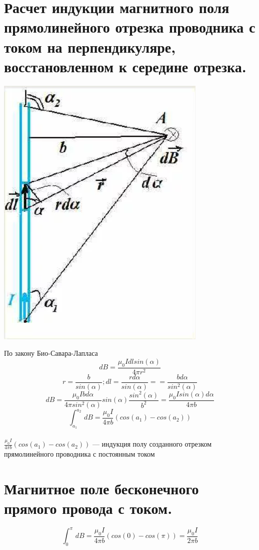 \documentclass[12pt]{report}
\begin{document}
\section{Расчет индукции магнитного поля прямолинейного отрезка проводника с током на перпендикуляре, восстановленном к середине отрезка.}
\begin{center}
    \includegraphics[scale=0.7]{graphics/t21.png}
\end{center}
По закону Био-Савара-Лапласа \[dB=\frac{\mu_0Idlsin(\alpha)}{4{\pi}r^2}\]
\[r=\frac{b}{sin(\alpha)}; dl=\frac{rd\alpha}{sin(\alpha)}==\frac{bd\alpha}{sin^2(\alpha)}\]
\[dB=\frac{\mu_0Ibd\alpha}{4{\pi}sin^2(\alpha)} sin(\alpha)\frac{sin^2(\alpha)}{b^2}=\frac{\mu_0Isin(\alpha)d\alpha}{4{\pi}b}\]
\[\int_{a_1}^{a_2} \,dB = \frac{\mu_0I}{4{\pi}b} (cos(a_1)-cos(a_2)) \] \\

$\frac{\mu_0I}{4{\pi}b} (cos(a_1)-cos(a_2))$ --- индукция полу созданного отрезком прямолинейного проводника с постоянным током
\section{Магнитное поле бесконечного прямого провода с током.}
\[\int_{0}^{\pi} \,dB = \frac{\mu_0I}{4{\pi}b} (cos(0)-cos(\pi)) = \frac{\mu_0I}{2{\pi}b} \]
\end{document}
